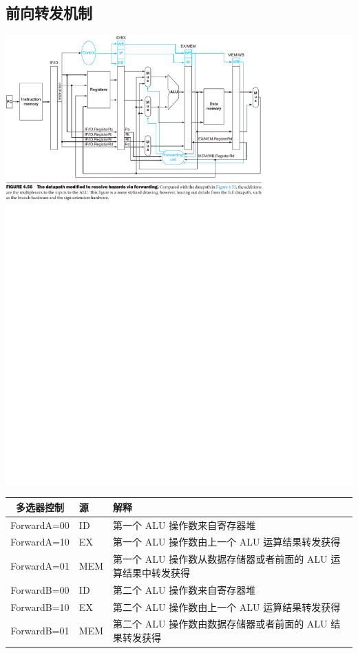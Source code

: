 \documentclass[a4paper,UTF8]{ctexart}
\begin{document}
\subsection{前向转发机制}
\includegraphics[width=\textwidth]{forwarding.pdf}

\begin{table}[h]
    \centering
    \begin{tabular}{>{\ttfamily}c>{\ttfamily}ll}
        \toprule
        多选器控制 & 源 & 解释 \\
        \midrule
        ForwardA=00 & ID & 第一个 ALU 操作数来自寄存器堆 \\
        ForwardA=10 & EX & 第一个 ALU 操作数由上一个 ALU 运算结果转发获得 \\
        ForwardA=01 & MEM & 第一个 ALU 操作数从数据存储器或者前面的 ALU 运算结果中转发获得 \\
        ForwardB=00 & ID & 第二个 ALU 操作数来自寄存器堆 \\
        ForwardB=10 & EX & 第二个 ALU 操作数由上一个 ALU 运算结果转发获得 \\
        ForwardB=01 & MEM & 第二个 ALU 操作数由数据存储器或者前面的 ALU 结果转发获得 \\
        \bottomrule
    \end{tabular}
\end{table}
\end{document}
